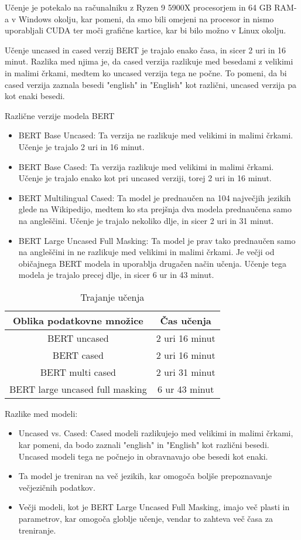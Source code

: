 \documentclass[sigconf,nonacm]{acmart}
\begin{document}
Učenje je potekalo na računalniku z Ryzen 9 5900X procesorjem in 64 GB RAM-a v Windows okolju, kar pomeni, da smo bili omejeni na procesor in nismo uporabljali CUDA ter moči grafične kartice, kar bi bilo možno v Linux okolju. 

Učenje uncased in cased verzij BERT je trajalo enako časa, in sicer 2 uri in 16 minut. Razlika med njima je, da cased verzija razlikuje med besedami z velikimi in malimi črkami, medtem ko uncased verzija tega ne počne. To pomeni, da bi cased verzija zaznala besedi "english" in "English" kot različni, uncased verzija pa kot enaki besedi.

Različne verzije modela BERT
\begin{itemize}
\item BERT Base Uncased: Ta verzija ne razlikuje med velikimi in malimi črkami. Učenje je trajalo 2 uri in 16 minut.
\item BERT Base Cased: Ta verzija razlikuje med velikimi in malimi črkami. Učenje je trajalo enako kot pri uncased verziji, torej 2 uri in 16 minut.
\item BERT Multilingual Cased: Ta model je prednaučen na 104 največjih jezikih glede na Wikipedijo, medtem ko sta prejšnja dva modela prednaučena samo na angleščini. Učenje je trajalo nekoliko dlje, in sicer 2 uri in 31 minut.
\item BERT Large Uncased Full Masking: Ta model je prav tako prednaučen samo na angleščini in ne razlikuje med velikimi in malimi črkami. Je večji od običajnega BERT modela in uporablja drugačen način učenja. Učenje tega modela je trajalo precej dlje, in sicer 6 ur in 43 minut.
\end{itemize}

\begin{table}
    \centering
    \caption{Trajanje učenja}
    \label{tab:table1}
    \begin{tabular}{cc}
        	\toprule
        	Oblika podatkovne množice&Čas učenja \\
       	 \midrule
        	BERT uncased & 2 uri 16 minut \\
       	BERT cased &  2 uri 16 minut\\
	BERT multi cased & 2 uri 31 minut \\
	BERT large uncased full masking  &  6 ur 43 minut\\
       	 \bottomrule
    \end{tabular}
\end{table}

Razlike med modeli:
\begin{itemize}
\item Uncased vs. Cased: Cased modeli razlikujejo med velikimi in malimi črkami, kar pomeni, da bodo zaznali "english" in "English" kot različni besedi. Uncased modeli tega ne počnejo in obravnavajo obe besedi kot enaki.
\item Ta model je treniran na več jezikih, kar omogoča boljše prepoznavanje večjezičnih podatkov.
\item Večji modeli, kot je BERT Large Uncased Full Masking, imajo več plasti in parametrov, kar omogoča globlje učenje, vendar to zahteva več časa za treniranje.
\end{itemize}
\end{document}
